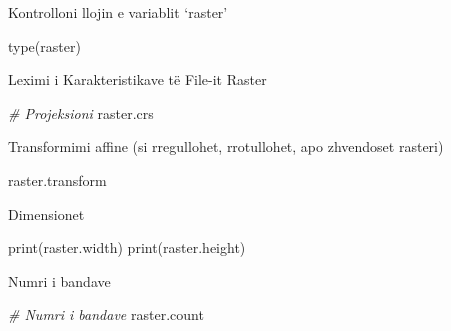 \documentclass[
  ignorenonframetext,
]{beamer}
\newenvironment{Shaded}{\begin{snugshade}}{\end{snugshade}}
\newcommand{\BuiltInTok}[1]{#1}
\newcommand{\CommentTok}[1]{\textcolor[rgb]{0.56,0.35,0.01}{\textit{#1}}}
\newcommand{\NormalTok}[1]{#1}
\begin{document}
\begin{frame}[fragile]{Kontrolloni llojin e variablit `raster'}
\protect\hypertarget{kontrolloni-llojin-e-variablit-raster}{}

\begin{Shaded}
\begin{Highlighting}[]
\BuiltInTok{type}\NormalTok{(raster)}
\end{Highlighting}
\end{Shaded}
\end{frame}

\begin{frame}[fragile]{Leximi i Karakteristikave të File-it Raster}
\protect\hypertarget{leximi-i-karakteristikave-tuxeb-file-it-raster}{}

\begin{Shaded}
\begin{Highlighting}[]
\CommentTok{\# Projeksioni}
\NormalTok{raster.crs}
\end{Highlighting}
\end{Shaded}
\end{frame}

\begin{frame}[fragile]{Transformimi affine (si rregullohet, rrotullohet,
apo zhvendoset rasteri)}
\protect\hypertarget{transformimi-affine-si-rregullohet-rrotullohet-apo-zhvendoset-rasteri}{}

\begin{Shaded}
\begin{Highlighting}[]
\NormalTok{raster.transform}
\end{Highlighting}
\end{Shaded}
\end{frame}

\begin{frame}[fragile]{Dimensionet}
\protect\hypertarget{dimensionet}{}

\begin{Shaded}
\begin{Highlighting}[]
\BuiltInTok{print}\NormalTok{(raster.width)}
\BuiltInTok{print}\NormalTok{(raster.height)}
\end{Highlighting}
\end{Shaded}
\end{frame}

\begin{frame}[fragile]{Numri i bandave}
\protect\hypertarget{numri-i-bandave}{}

\begin{Shaded}
\begin{Highlighting}[]
\CommentTok{\# Numri i bandave}
\NormalTok{raster.count}
\end{Highlighting}
\end{Shaded}
\end{frame}
\end{document}
